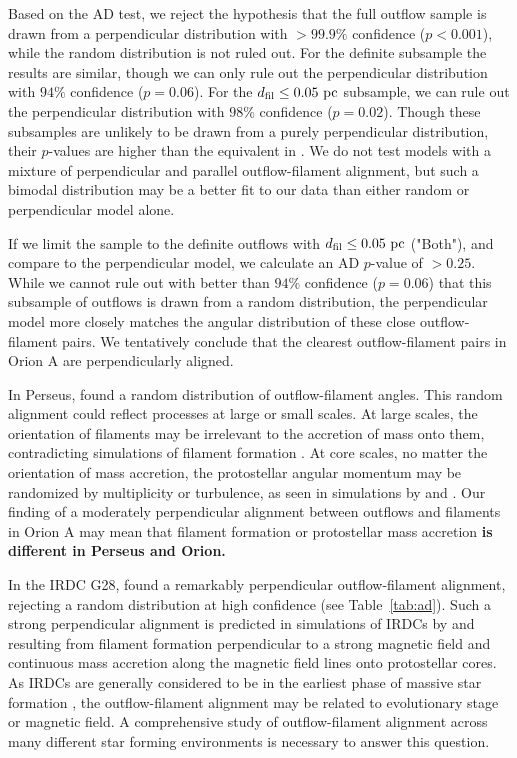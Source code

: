 \documentclass[twocolumn]{aastex63}
\begin{document}
Based on the AD test, we reject the hypothesis that the full outflow sample is drawn from a perpendicular distribution with $>99.9\%$ confidence ($p < 0.001$), while the random distribution is not ruled out. For the definite subsample the results are similar, though we can only rule out the perpendicular distribution with $94\%$ confidence ($p = 0.06$). For the $d_{\rm fil} \leq 0.05~\rm{pc}$ subsample, we can rule out the perpendicular distribution with $98\%$ confidence ($p = 0.02$). Though these subsamples are unlikely to be drawn from a purely perpendicular distribution, their $p$-values are higher than the equivalent in \citet{Stephens17}. We do not test models with a mixture of perpendicular and parallel outflow-filament alignment, but such a bimodal distribution may be a better fit to our data than either random or perpendicular model alone.

If we limit the sample to the definite outflows with $d_{\rm fil} \leq 0.05~\rm{pc}$ ("Both"), and compare to the perpendicular model, we calculate an AD $p$-value of $> 0.25$. While we cannot rule out with better than $94\%$ confidence ($p = 0.06$) that this subsample of outflows is drawn from a random distribution, the perpendicular model more closely matches the angular distribution of these close outflow-filament pairs. We tentatively conclude that the clearest outflow-filament pairs in Orion A are perpendicularly aligned.

In Perseus, \citet{Stephens17} found a random distribution of outflow-filament angles. This random alignment could reflect processes at large or small scales. At large scales, the orientation of filaments may be irrelevant to the accretion of mass onto them, contradicting simulations of filament formation \citep[e.g.][]{Chen14,Clarke17}. At core scales, no matter the orientation of mass accretion, the protostellar angular momentum may be randomized by multiplicity or turbulence, as seen in simulations by \citet{Offner16} and \citet{Lee17}. Our finding of a moderately perpendicular alignment between outflows and filaments in Orion A may mean that filament formation or protostellar mass accretion \textbf{is different in Perseus and Orion.}

In the IRDC G28, \citet{Kong19} found a remarkably perpendicular outflow-filament alignment, rejecting a random distribution at high confidence (see Table~\ref{tab:ad}). Such a strong perpendicular alignment is predicted in simulations of IRDCs by \citet{Li18} and \citet{Li19} resulting from filament formation perpendicular to a strong magnetic field and continuous mass accretion along the magnetic field lines onto protostellar cores. As IRDCs are generally considered to be in the earliest phase of massive star formation \citep{Rathborne06}, the outflow-filament alignment may be related to evolutionary stage or magnetic field. A comprehensive study of outflow-filament alignment across many different star forming environments is necessary to answer this question.
\end{document}
